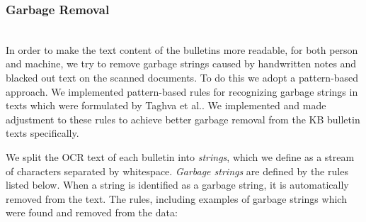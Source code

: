 \documentclass[a4paper, 10pt, conference]{ieeeconf}      %
\begin{document}
\subsubsection{Garbage Removal}\label{garbage removal}~\\
In order to make the text content of the bulletins more readable, for both person and machine, we try to remove garbage strings caused by handwritten notes and blacked out text on the scanned documents. To do this we adopt a pattern-based approach. We implemented pattern-based rules for recognizing garbage strings in texts which were formulated by Taghva et al.\cite{taghva2001automatic}. We implemented and made adjustment to these rules to achieve better garbage removal from the KB bulletin texts specifically.

We split the OCR text of each bulletin into \textit{strings}, which we define as a stream of characters separated by whitespace. \textit{Garbage strings} are defined by the rules listed below. When a string is identified as a garbage string, it is automatically removed from the text. The rules, including examples of garbage strings which were found and removed from the data:
\end{document}
